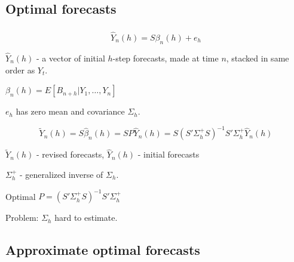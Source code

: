 \documentclass[c, dvipsnames]{beamer}  %
\begin{document}
\subsection{Optimal forecasts}

\begin{frame}[shrink=5]
\frametitle{\insertsection} 
\framesubtitle{\insertsubsection}

\[ \hat{Y}_n ( h ) = S \beta_n ( h ) + e_h  \]

$ \hat{Y}_n ( h ) $ - a vector of initial $ h $-step forecasts,
made at time $ n $, stacked in same order as $ Y_t  $.

$ \beta_n ( h )   = E [ B _{n + h} | Y_1 , \dots , Y_n ]  $

$ e_h  $  has zero mean and covariance $ \Sigma_h  $.

\[ \tilde{Y}_n ( h )
= S \hat{\beta}_n ( h ) = S P  \hat{Y}_n ( h ) =  S ( S' \Sigma^{+}_h S )^{-1}  S'  \Sigma^{+}_h  \hat{Y}_n ( h )
 \]
 
$ \tilde{Y}_n ( h ) $   - revised forecasts, 
$ \hat{Y}_n ( h ) $ - initial forecasts

$ \Sigma^{+}_h $ - generalized inverse of $ \Sigma_h $.

Optimal $ P = ( S' \Sigma^{+}_h S )^{-1}  S'  \Sigma^{+}_h  $

Problem: $ \Sigma_h $ hard to estimate.

\end{frame}



\subsection{Approximate optimal forecasts}
\end{document}
